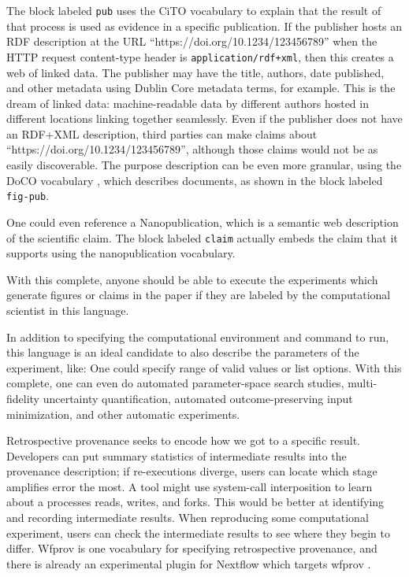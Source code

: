 \documentclass[manuscript,authordraft]{acmart}
\begin{document}
The block labeled \texttt{pub} uses the CiTO vocabulary
\cite{shotton_cito_2010} to explain that the result of that process is
used as evidence in a specific publication. If the publisher hosts an
RDF description at the URL ``https://doi.org/10.1234/123456789'' when
the HTTP request content-type header is \texttt{application/rdf+xml},
then this creates a web of linked data. The publisher may have the
title, authors, date published, and other metadata using Dublin Core
metadata terms, for example. This is the dream of linked data:
machine-readable data by different authors hosted in different locations
linking together seamlessly. Even if the publisher does not have an
RDF+XML description, third parties can make claims about
``https://doi.org/10.1234/123456789'', although those claims would not
be as easily discoverable. The purpose description can be even more
granular, using the DoCO vocabulary \cite{constantin_document_2016},
which describes documents, as shown in the block labeled
\texttt{fig-pub}.

One could even reference a Nanopublication, which is a semantic web
description of the scientific claim. The block labeled \texttt{claim}
actually embeds the claim that it supports using the nanopublication
vocabulary.

With this complete, anyone should be able to execute the experiments
which generate figures or claims in the paper if they are labeled by the
computational scientist in this language.

In addition to specifying the computational environment and command to
run, this language is an ideal candidate to also describe the parameters
of the experiment, like: One could specify range of valid values or list
options. With this complete, one can even do automated parameter-space
search studies, multi-fidelity uncertainty quantification, automated
outcome-preserving input minimization, and other automatic experiments.

Retrospective provenance seeks to encode how we got to a specific
result. Developers can put summary statistics of intermediate results
into the provenance description; if re-executions diverge, users can
locate which stage amplifies error the most. A tool might use
system-call interposition to learn about a processes reads, writes, and
forks. This would be better at identifying and recording intermediate
results. When reproducing some computational experiment, users can check
the intermediate results to see where they begin to differ. Wfprov is
one vocabulary for specifying retrospective provenance, and there is
already an experimental plugin for Nextflow which targets wfprov
\cite{grande_nf-prov_2023}.
\end{document}
